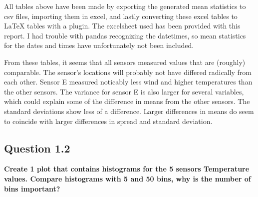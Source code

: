 \documentclass{report}
\begin{document}
	All tables above have been made by exporting the generated mean statistics to csv files, importing them in excel, and lastly converting these excel tables to LaTeX tables with a plugin. The excelsheet used has been provided with this report. I had trouble with pandas recognizing the datetimes, so mean statistics for the dates and times have unfortunately not been included.
	
	From these tables, it seems that all sensors measured values that are (roughly) comparable. The sensor's locations will probably not have differed radically from each other. Sensor E measured noticably less wind and higher temperatures than the other sensors. The variance for sensor E is also larger for several variables, which could explain some of the difference in means from the other sensors. The standard deviations show less of a difference. Larger differences in means do seem to coincide with larger differences in spread and standard deviation.
	
	
	\subsection{Question 1.2}
	\textbf{Create 1 plot that contains histograms for the 5 sensors Temperature values. Compare histograms with 5 and 50 bins, why is the number of bins important?}
\end{document}
